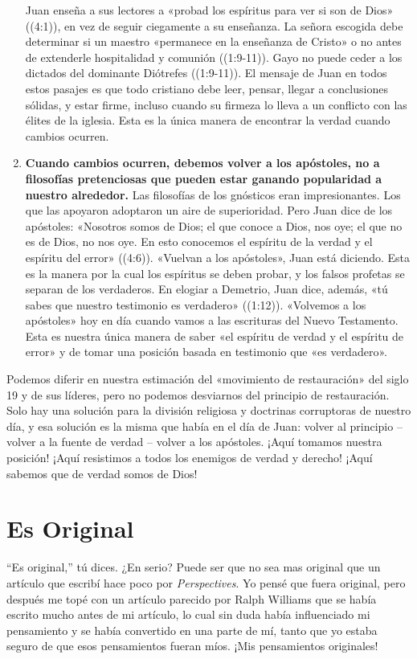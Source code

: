 \documentclass[12pt, twoside, openright]{book}
\begin{document}
\begin{enumerate}
Juan enseña a sus lectores a «probad los espíritus para ver si son de Dios» ((4:1)), en vez de seguir ciegamente a su enseñanza. La señora escogida debe determinar si un maestro «permanece en la enseñanza de Cristo» o no antes de extenderle hospitalidad y comunión ((1:9-11)). Gayo no puede ceder a los dictados del dominante Diótrefes ((1:9-11)). El mensaje de Juan en todos estos pasajes es que todo cristiano debe leer, pensar, llegar a conclusiones sólidas, y estar firme, incluso cuando su firmeza lo lleva a un conflicto con las élites de la iglesia. Esta es la única manera de encontrar la verdad cuando cambios ocurren. 
\item  \textbf{Cuando cambios ocurren, debemos volver a los apóstoles, no a filosofías pretenciosas que pueden estar ganando popularidad a nuestro alrededor.} Las filosofías de los gnósticos eran impresionantes. Los que las apoyaron adoptaron un aire de superioridad. Pero Juan dice de los apóstoles: «Nosotros somos de Dios; el que conoce a Dios, nos oye; el que no es de Dios, no nos oye. En esto conocemos el espíritu de la verdad y el espíritu del error» ((4:6)). «Vuelvan a los apóstoles», Juan está diciendo. Esta es la manera por la cual los espíritus se deben probar, y los falsos profetas se separan de los verdaderos. En elogiar a Demetrio, Juan dice, además, «tú sabes que nuestro testimonio es verdadero» ((1:12)). «Volvemos a los apóstoles» hoy en día cuando vamos a las escrituras del Nuevo Testamento. Esta es nuestra única manera de saber «el espíritu de verdad y el espíritu de error» y de tomar una posición basada en testimonio que «es verdadero».
\end{enumerate}
Podemos diferir en nuestra estimación del «movimiento de restauración» del siglo 19 y de sus líderes, pero no podemos desviarnos del principio de restauración. Solo hay una solución para la división religiosa y doctrinas corruptoras de nuestro día, y esa solución es la misma que había en el día de Juan: volver al principio – volver a la fuente de verdad – volver a los apóstoles. ¡Aquí tomamos nuestra posición! ¡Aquí resistimos a todos los enemigos de verdad y derecho! ¡Aquí sabemos que de verdad somos de Dios!

\section{Es Original}
“Es original,” tú dices. ¿En serio? Puede ser que no sea mas original que un artículo que escribí hace poco por \textit{Perspectives}. Yo pensé que fuera original, pero después me topé con un artículo parecido por Ralph Williams que se había escrito mucho antes de mi artículo, lo cual sin duda había influenciado mi pensamiento y se había convertido en una parte de mí, tanto que yo estaba seguro de que esos pensamientos fueran míos. ¡Mis pensamientos originales!
\end{document}
